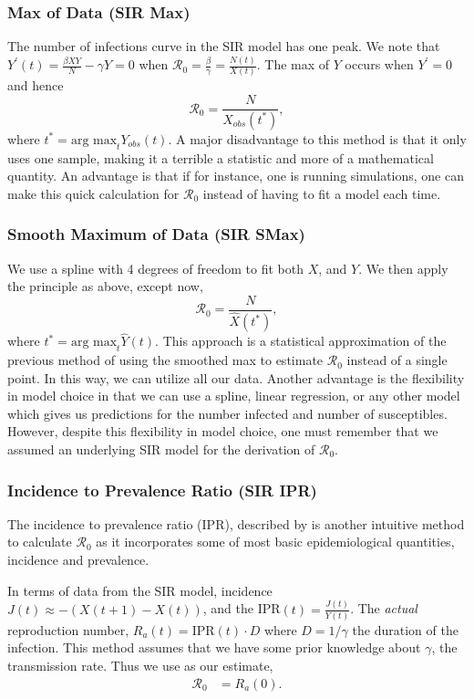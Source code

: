 \documentclass[12pt]{article}
\newcommand{\rr}{\ensuremath{\mathcal{R}_0}}
\begin{document}
\subsubsection{Max of Data (SIR Max)}\label{max-of-data}
The number of infections curve in the SIR model has one peak.    We note that \(Y^\prime(t) = \frac{\beta XY}{N} - \gamma Y = 0\) when \(\rr = \frac{\beta}{\gamma} = \frac{N(t)}{X(t)}\). The max
of \(Y\) occurs when \(Y^\prime = 0\) and hence
\[\rr = \frac{N}{X_{obs}(t^*)},\] where
\(t^* = \text{arg max}_{t} Y_{obs}(t)\).   A major disadvantage to this method is that it only uses one sample, making it a terrible a statistic and more of a mathematical quantity.  An advantage is that if for instance, one is running simulations, one can make this quick calculation for $\rr$ instead of having to fit a model each time.

\subsubsection{Smooth Maximum of Data (SIR SMax)}\label{smooth-maximum-of-data}

We use a spline with 4 degrees of freedom to fit both \(X\), and \(Y\).
We then apply the principle as above, except now,
\[\rr = \frac{N}{\hat{X}(t^*)},\] where
\(t^* = \text{arg max}_{t} \hat{Y}(t)\).   This approach is a statistical approximation of the previous method of using the smoothed max to estimate $\rr$ instead of a single point.  In this way, we can utilize all our data.  Another advantage is the flexibility in model choice in that we can use a spline, linear regression, or any other model which gives us predictions for the number infected and number of susceptibles.  However, despite this flexibility in model choice, one must remember that we assumed an underlying SIR model for the derivation of $\rr$.

\subsubsection{Incidence to Prevalence
  Ratio (SIR IPR)}\label{incidence-to-prevalence-ratio}
The incidence to prevalence ratio (IPR), described by \cite{Nishiura2009} is another intuitive method to calculate $\rr$ as it incorporates some of most basic epidemiological quantities, incidence and prevalence.

In terms of data from the SIR model, incidence $J(t) \approx -(X(t+1) - X(t))$, and the IPR$(t) = \frac{J(t)}{Y(t)}$. The \textit{actual} reproduction number, $R_a(t) = \text{IPR}(t)\cdot D$ where $D = 1 /\gamma$ the duration of the infection.  This method assumes that we have some prior knowledge about $\gamma$, the transmission rate.  Thus we use as our estimate,
\begin{align*}
\rr &= R_a(0).
\end{align*}
\end{document}
